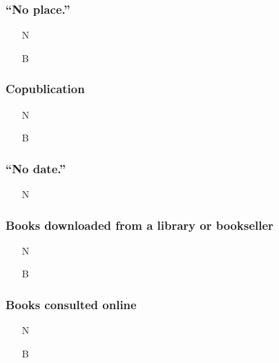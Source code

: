 \documentclass[11pt,letterpaper,oneside]{article}
\begin{document}
\setcounter{subsubsection}{137}
\subsubsection{``No place.''}

\begin{itemize}
\item[N] 

\item[B] 
\end{itemize}

\setcounter{subsubsection}{146}
\subsubsection{Copublication}

\begin{itemize}
\item[N] 

\item[B] 
\end{itemize}

\setcounter{subsubsection}{151}
\subsubsection{``No date.''}

\begin{itemize}
\item[N] 
\end{itemize}

\setcounter{subsubsection}{165}
\subsubsection{Books downloaded from a library or bookseller}

\begin{itemize}
\item[N] 

\item[B] 
\end{itemize}

\subsubsection{Books consulted online}

\begin{itemize}
\item[N] 

\item[B] 
\end{itemize}
\end{document}
